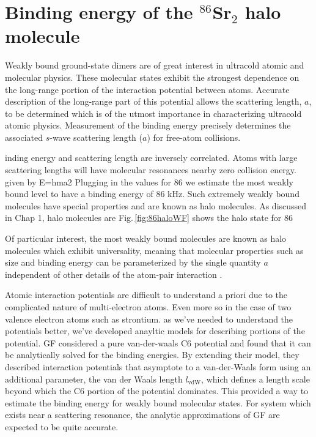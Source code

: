 \chapter{Binding energy of the $^{86}$Sr$_2$ halo molecule} \label{ch:chap5}

Weakly bound ground-state dimers are of great interest in ultracold atomic and molecular physics. 
These molecular states exhibit the strongest dependence on the long-range portion of the interaction potential between atoms.
Accurate description of the long-range part of this potential allows the scattering length, $a$, to be determined which is of the utmost importance in characterizing ultracold atomic physics.
Measurement of the binding energy precisely determines the associated $s$-wave scattering length ($a$) for free-atom collisions. 


inding energy and scattering length are inversely correlated.
Atoms with large scattering lengths will have molecular resonances nearby zero collision energy.
given by E=hma2
Plugging in the values for 86 we estimate the most weakly bound level to have a binding energy of 86 kHz.
Such extremely weakly bound molecules have special properties and are known as halo molecules.
As discussed in Chap 1, halo molecules are
Fig.\,\ref{fig:86haloWF} shows the halo state for 86

Of particular interest, the most weakly bound molecules are known as halo molecules which exhibit universality, meaning that molecular properties such as size and binding energy can be parameterized by the single quantity $a$ independent of other details of the atom-pair interaction \cite{kgj06,bha06}.



Atomic interaction potentials are difficult to understand a priori due to the complicated nature of multi-electron atoms.
Even more so in the case of two valence electron atoms such as strontium.
as we've needed to understand the potentials better, we've developed anayltic models for describing portions of the potential.
GF considered a pure van-der-waals C6 potential and found that it can be analytically solved for the binding energies.
By extending their model, they described interaction potentials that asymptote to a van-der-Waals form using an additional parameter, the van der Waals length $l_{\mathrm{vdW}}$, which defines a length scale beyond which the C6 portion of the potential dominates.
This provided a way to estimate the binding energy for weakly bound molecular states.
For system which exists near a scattering resonance, the analytic approximations of GF are expected to be quite accurate.

